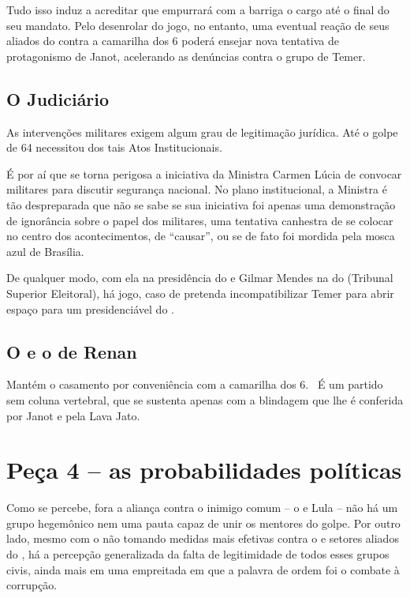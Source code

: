 Tudo isso induz a acreditar que empurrará com a barriga o cargo até o
final do seu mandato. Pelo desenrolar do jogo, no entanto, uma eventual
reação de seus aliados do  contra a camarilha dos 6 poderá ensejar
nova tentativa de protagonismo de Janot, acelerando as denúncias contra
o grupo de Temer.

\subsection{O Judiciário~}

As intervenções militares exigem algum grau de legitimação jurídica. Até
o golpe de 64 necessitou dos tais Atos Institucionais.

É por aí que se torna perigosa a iniciativa da Ministra Carmen Lúcia de
convocar militares para discutir segurança nacional. No plano
institucional, a Ministra é tão despreparada que não se sabe se sua
iniciativa foi apenas uma demonstração de ignorância sobre o papel dos
militares, uma tentativa canhestra de se colocar no centro dos
acontecimentos, de ``causar'', ou se de fato foi mordida pela mosca azul
de Brasília.

De qualquer modo, com ela na presidência do  e Gilmar Mendes na do
 (Tribunal Superior Eleitoral), há jogo, caso de pretenda
incompatibilizar Temer para abrir espaço para um presidenciável do .

\subsection{O  e o  de Renan}

Mantém o casamento por conveniência com a camarilha dos 6. ~É um partido
sem coluna vertebral, que se sustenta apenas com a blindagem que lhe é
conferida por Janot e pela Lava Jato.

\section{Peça 4 -- as probabilidades políticas}

Como se percebe, fora a aliança contra o inimigo comum -- o  e Lula --
não há um grupo hegemônico nem uma pauta capaz de unir os mentores do
golpe. Por outro lado, mesmo com o  não tomando medidas mais efetivas
contra o  e setores aliados do , há a percepção generalizada da
falta de legitimidade de todos esses grupos civis, ainda mais em uma
empreitada em que a palavra de ordem foi o combate à corrupção.

